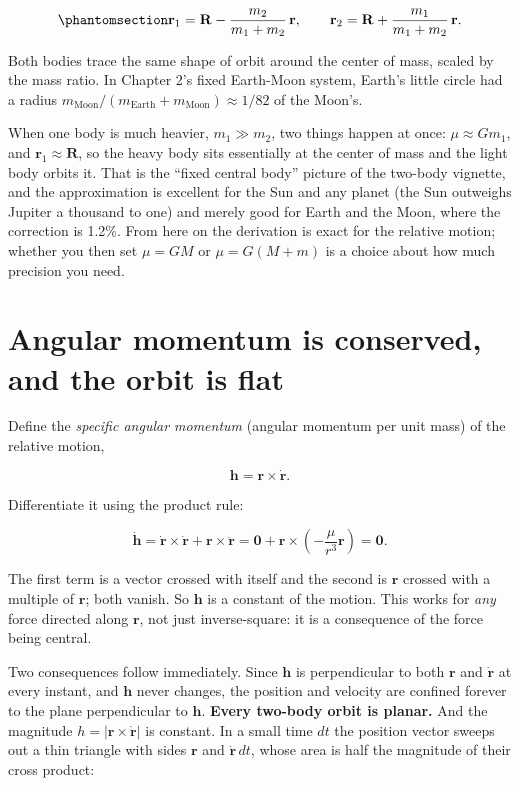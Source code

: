 \documentclass[
  10.5pt,
  letterpaper,
]{scrbook}
\theoremstyle{plain}
\theoremstyle{remark}
\begin{document}
\begin{equation}\protect\phantomsection\label{eq-individual}{
\mathbf{r}_1 = \mathbf{R} - \frac{m_2}{m_1+m_2}\,\mathbf{r}, \qquad
\mathbf{r}_2 = \mathbf{R} + \frac{m_1}{m_1+m_2}\,\mathbf{r}.
}\end{equation}

Both bodies trace the same shape of orbit around the center of mass,
scaled by the mass ratio. In Chapter 2's fixed Earth-Moon system,
Earth's little circle had a radius
\(m_{\mathrm{Moon}}/(m_{\mathrm{Earth}}+m_{\mathrm{Moon}}) \approx 1/82\)
of the Moon's.

When one body is much heavier, \(m_1 \gg m_2\), two things happen at
once: \(\mu \approx G m_1\), and \(\mathbf{r}_1 \approx \mathbf{R}\), so
the heavy body sits essentially at the center of mass and the light body
orbits it. That is the ``fixed central body'' picture of the two-body
vignette, and the approximation is excellent for the Sun and any planet
(the Sun outweighs Jupiter a thousand to one) and merely good for Earth
and the Moon, where the correction is 1.2\%. From here on the derivation
is exact for the relative motion; whether you then set \(\mu = GM\) or
\(\mu = G(M+m)\) is a choice about how much precision you need.

\section{Angular momentum is conserved, and the orbit is
flat}\label{angular-momentum-is-conserved-and-the-orbit-is-flat}

Define the \emph{specific angular momentum} (angular momentum per unit
mass) of the relative motion,

\[
\mathbf{h} = \mathbf{r} \times \dot{\mathbf{r}}.
\]

Differentiate it using the product rule:

\[
\dot{\mathbf{h}} = \dot{\mathbf{r}} \times \dot{\mathbf{r}} + \mathbf{r} \times \ddot{\mathbf{r}}
= \mathbf{0} + \mathbf{r} \times \left(-\frac{\mu}{r^3}\mathbf{r}\right) = \mathbf{0}.
\]

The first term is a vector crossed with itself and the second is
\(\mathbf{r}\) crossed with a multiple of \(\mathbf{r}\); both vanish.
So \(\mathbf{h}\) is a constant of the motion. This works for \emph{any}
force directed along \(\mathbf{r}\), not just inverse-square: it is a
consequence of the force being central.

Two consequences follow immediately. Since \(\mathbf{h}\) is
perpendicular to both \(\mathbf{r}\) and \(\dot{\mathbf{r}}\) at every
instant, and \(\mathbf{h}\) never changes, the position and velocity are
confined forever to the plane perpendicular to \(\mathbf{h}\).
\textbf{Every two-body orbit is planar.} And the magnitude
\(h = |\mathbf{r}\times\dot{\mathbf{r}}|\) is constant. In a small time
\(dt\) the position vector sweeps out a thin triangle with sides
\(\mathbf{r}\) and \(\dot{\mathbf{r}}\,dt\), whose area is half the
magnitude of their cross product:
\end{document}
